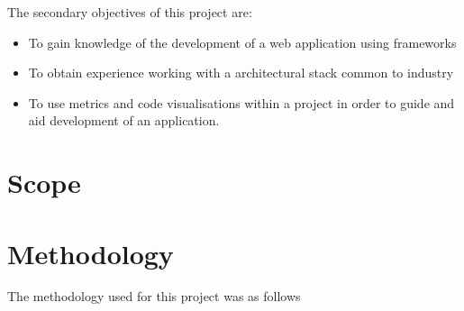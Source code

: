 The secondary objectives of this project are: 

\begin{itemize}
\item To gain knowledge of the development of a web application using frameworks
\item To obtain experience working with a architectural stack common to industry
\item To use metrics and code visualisations within a project in order to guide and aid development of an application.
\end{itemize}

\section{Scope}



\section{Methodology}

The methodology used for this project was as follows

